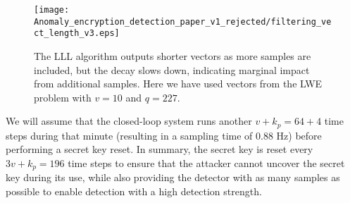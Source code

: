 \documentclass[journal, twoside, web]{ieeecolorpreprint}
\begin{document}

\begin{figure}
\centering
    \texttt{[image: Anomaly\_encryption\_detection\_paper\_v1\_rejected/filtering\_vect\_length\_v3.eps]}
    \caption{The LLL algorithm outputs shorter vectors as more samples are included, but the decay slows down, indicating marginal impact from additional samples. Here we have used vectors from the LWE problem with  $v = 10$ and $q = 227$.}
    \label{fig:length_structure_tradeoff}
\end{figure}



We will assume that the closed-loop system runs another $v+k_p=64+4$ time steps during that minute (resulting in a sampling time of 0.88 Hz) before performing a secret key reset. In summary, the secret key is reset every $3v+k_p=196$ time steps to ensure that the attacker cannot uncover the secret key during its use, while also providing the detector with as many samples as possible to enable detection with a high detection strength.

\end{document}
